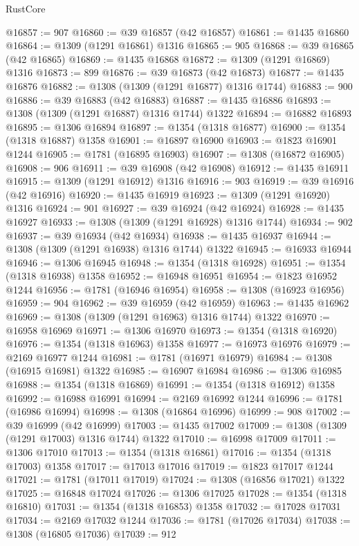 \begin{lexlean}{RustCore}
\begin{coremodule}
@16857 := 907
@16860 := @39 @16857 (@42 @16857)
@16861 := @1435 @16860
@16864 := @1309 (@1291 @16861) @1316
@16865 := 905
@16868 := @39 @16865 (@42 @16865)
@16869 := @1435 @16868
@16872 := @1309 (@1291 @16869) @1316
@16873 := 899
@16876 := @39 @16873 (@42 @16873)
@16877 := @1435 @16876
@16882 := @1308 (@1309 (@1291 @16877) @1316 @1744)
@16883 := 900
@16886 := @39 @16883 (@42 @16883)
@16887 := @1435 @16886
@16893 := @1308 (@1309 (@1291 @16887) @1316 @1744) @1322
@16894 := @16882 @16893
@16895 := @1306 @16894
@16897 := @1354 (@1318 @16877)
@16900 := @1354 (@1318 @16887) @1358
@16901 := @16897 @16900
@16903 := @1823 @16901 @1244
@16905 := @1781 (@16895 @16903)
@16907 := @1308 (@16872 @16905)
@16908 := 906
@16911 := @39 @16908 (@42 @16908)
@16912 := @1435 @16911
@16915 := @1309 (@1291 @16912) @1316
@16916 := 903
@16919 := @39 @16916 (@42 @16916)
@16920 := @1435 @16919
@16923 := @1309 (@1291 @16920) @1316
@16924 := 901
@16927 := @39 @16924 (@42 @16924)
@16928 := @1435 @16927
@16933 := @1308 (@1309 (@1291 @16928) @1316 @1744)
@16934 := 902
@16937 := @39 @16934 (@42 @16934)
@16938 := @1435 @16937
@16944 := @1308 (@1309 (@1291 @16938) @1316 @1744) @1322
@16945 := @16933 @16944
@16946 := @1306 @16945
@16948 := @1354 (@1318 @16928)
@16951 := @1354 (@1318 @16938) @1358
@16952 := @16948 @16951
@16954 := @1823 @16952 @1244
@16956 := @1781 (@16946 @16954)
@16958 := @1308 (@16923 @16956)
@16959 := 904
@16962 := @39 @16959 (@42 @16959)
@16963 := @1435 @16962
@16969 := @1308 (@1309 (@1291 @16963) @1316 @1744) @1322
@16970 := @16958 @16969
@16971 := @1306 @16970
@16973 := @1354 (@1318 @16920)
@16976 := @1354 (@1318 @16963) @1358
@16977 := @16973 @16976
@16979 := @2169 @16977 @1244
@16981 := @1781 (@16971 @16979)
@16984 := @1308 (@16915 @16981) @1322
@16985 := @16907 @16984
@16986 := @1306 @16985
@16988 := @1354 (@1318 @16869)
@16991 := @1354 (@1318 @16912) @1358
@16992 := @16988 @16991
@16994 := @2169 @16992 @1244
@16996 := @1781 (@16986 @16994)
@16998 := @1308 (@16864 @16996)
@16999 := 908
@17002 := @39 @16999 (@42 @16999)
@17003 := @1435 @17002
@17009 := @1308 (@1309 (@1291 @17003) @1316 @1744) @1322
@17010 := @16998 @17009
@17011 := @1306 @17010
@17013 := @1354 (@1318 @16861)
@17016 := @1354 (@1318 @17003) @1358
@17017 := @17013 @17016
@17019 := @1823 @17017 @1244
@17021 := @1781 (@17011 @17019)
@17024 := @1308 (@16856 @17021) @1322
@17025 := @16848 @17024
@17026 := @1306 @17025
@17028 := @1354 (@1318 @16810)
@17031 := @1354 (@1318 @16853) @1358
@17032 := @17028 @17031
@17034 := @2169 @17032 @1244
@17036 := @1781 (@17026 @17034)
@17038 := @1308 (@16805 @17036)
@17039 := 912

\end{coremodule}
\end{lexlean}
